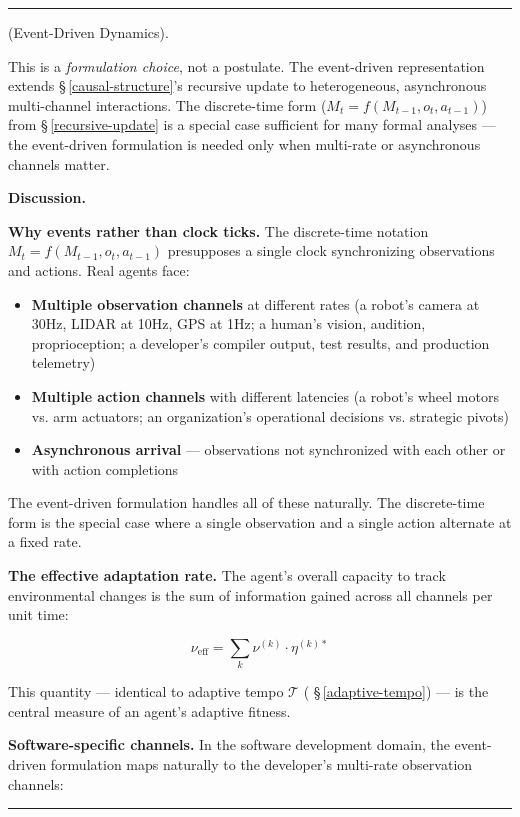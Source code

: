 \documentclass[11pt,oneside]{article}
\newcounter{claim}[section]
\renewcommand{\theclaim}{\thesection.\arabic{claim}}
\newenvironment{segment}[2]{%
  \refstepcounter{claim}%
  \bigskip\noindent\hrule\smallskip
  \noindent{\bfseries #1~\theclaim}\enskip(#2).\par\smallskip
  \noindent\ignorespaces
}{%
  \par\smallskip\noindent\hrule\bigskip
}
\newenvironment{formulation}[1][]{\begin{segment}{Formulation}{#1}}{\end{segment}}
\begin{document}
\begin{formulation}[Event-Driven Dynamics]
This is a \textit{formulation choice}, not a postulate. The event-driven representation extends \S\,\ref{causal-structure}'s recursive update to heterogeneous, asynchronous multi-channel interactions. The discrete-time form ($M_t = f(M_{t-1}, o_t, a_{t-1})$) from \S\,\ref{recursive-update} is a special case sufficient for many formal analyses — the event-driven formulation is needed only when multi-rate or asynchronous channels matter.


\medskip\noindent\textbf{Discussion.}


\textbf{Why events rather than clock ticks.} The discrete-time notation $M_t = f(M_{t-1}, o_t, a_{t-1})$ presupposes a single clock synchronizing observations and actions. Real agents face:

\begin{itemize}
  \item \textbf{Multiple observation channels} at different rates (a robot's camera at 30Hz, LIDAR at 10Hz, GPS at 1Hz; a human's vision, audition, proprioception; a developer's compiler output, test results, and production telemetry)
  \item \textbf{Multiple action channels} with different latencies (a robot's wheel motors vs. arm actuators; an organization's operational decisions vs. strategic pivots)
  \item \textbf{Asynchronous arrival} — observations not synchronized with each other or with action completions
\end{itemize}


The event-driven formulation handles all of these naturally. The discrete-time form is the special case where a single observation and a single action alternate at a fixed rate.

\textbf{The effective adaptation rate.} The agent's overall capacity to track environmental changes is the sum of information gained across all channels per unit time:

$$\nu_{\text{eff}} = \sum_k \nu^{(k)} \cdot \eta^{(k)*}$$

This quantity — identical to adaptive tempo $\mathcal{T}$ ( \S\,\ref{adaptive-tempo}) — is the central measure of an agent's adaptive fitness.

\textbf{Software-specific channels.} In the software development domain, the event-driven formulation maps naturally to the developer's multi-rate observation channels:


\end{formulation}
\end{document}
